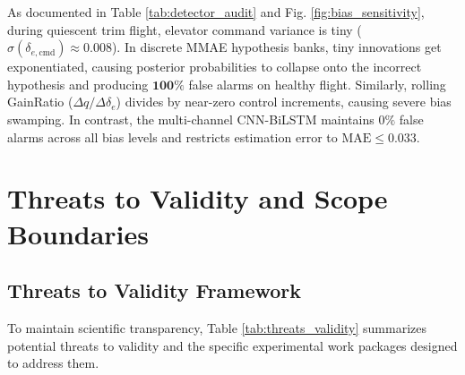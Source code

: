 \documentclass[review,12pt]{elsarticle}
\begin{document}
As documented in Table \ref{tab:detector_audit} and Fig. \ref{fig:bias_sensitivity}, during quiescent trim flight, elevator command variance is tiny ($\sigma(\delta_{e,\text{cmd}}) \approx 0.008$). In discrete MMAE hypothesis banks, tiny innovations get exponentiated, causing posterior probabilities to collapse onto the incorrect hypothesis and producing $\bm{100\%}$ false alarms on healthy flight. Similarly, rolling GainRatio ($\Delta q / \Delta \delta_e$) divides by near-zero control increments, causing severe bias swamping. In contrast, the multi-channel CNN-BiLSTM maintains $0\%$ false alarms across all bias levels and restricts estimation error to $\text{MAE} \le 0.033$.

\section{Threats to Validity and Scope Boundaries}
\label{sec:threats}

\subsection{Threats to Validity Framework}
\label{sec:threats_framework}

To maintain scientific transparency, Table \ref{tab:threats_validity} summarizes potential threats to validity and the specific experimental work packages designed to address them.
\end{document}
